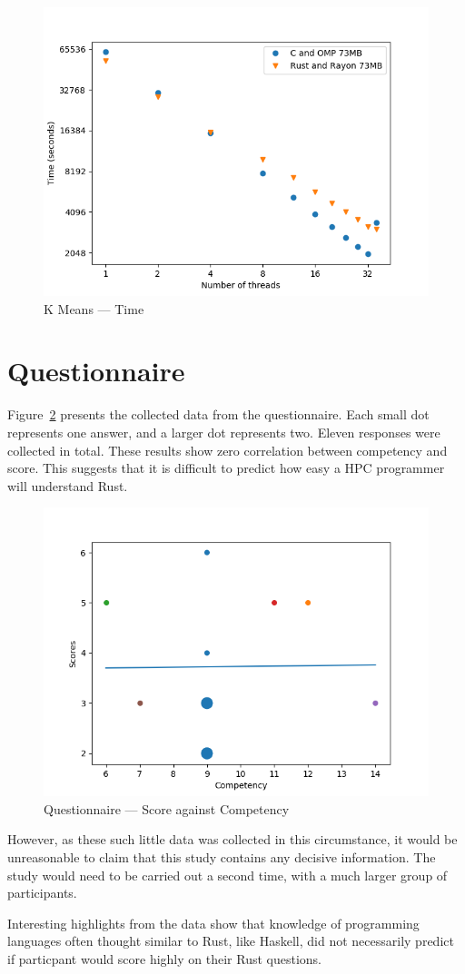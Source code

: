 \begin{figure}[h]
\centering
\includegraphics[width=.9\linewidth]{figs/kmeans/time.png}
\caption{K Means --- Time}\label{fig:kmeans-time}

\end{figure}
\section{Questionnaire}
Figure~\ref{fig:questions} presents the collected data from the questionnaire. Each small dot represents one answer, and a larger dot represents two. Eleven responses were collected in total.
These results show zero correlation between competency and score. This suggests that it is difficult to predict how easy a HPC programmer will understand Rust. 

\begin{figure}[h]
\centering
\includegraphics[width=.8\linewidth]{figs/questions/scatter.png}
\caption{Questionnaire --- Score against Competency}\label{fig:questions}
\end{figure}

However, as these such little data was collected in this circumstance, it would be unreasonable to claim that this study contains any decisive information. The study would need to be carried out a second time, with a much larger group of participants.

Interesting highlights from the data  show that knowledge of programming languages often thought similar to Rust, like Haskell, did not necessarily predict if  particpant would score highly on their Rust questions.
